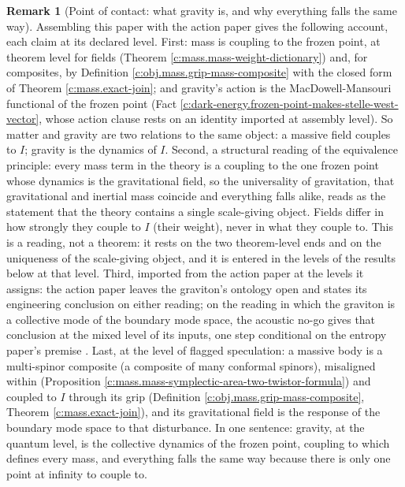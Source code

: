 \documentclass[11pt]{article}
\theoremstyle{definition}
\newtheorem{remark}[theorem]{Remark}
\theoremstyle{plain}
\newcommand{\changedmark}[2]{\marginpar{\raggedright\scriptsize\color{#1}#2}}
\begin{document}
\begin{remark}[Point of contact: what gravity is, and why everything falls the same way]\label{c:note.mass.point-contact-what-gravity-why-everything}
\changedmark{gray}{reworded}
Assembling this paper with the action paper gives the following account, each claim at its declared level. First: mass is coupling to the frozen point, at theorem level for fields (Theorem \ref{c:mass.mass-weight-dictionary}) and, for composites, by Definition \ref{c:obj.mass.grip-mass-composite} with the closed form of Theorem \ref{c:mass.exact-join}; and gravity's action is the MacDowell-Mansouri functional of the frozen point (Fact \ref{c:dark-energy.frozen-point-makes-stelle-west-vector}, whose action clause rests on an identity imported at assembly level). So matter and gravity are two relations to the same object: a massive field couples to $I$; gravity is the dynamics of $I$. Second, a structural reading of the equivalence principle: every mass term in the theory is a coupling to the one frozen point whose dynamics is the gravitational field, so the universality of gravitation, that gravitational and inertial mass coincide and everything falls alike, reads as the statement that the theory contains a single scale-giving object. Fields differ in how strongly they couple to $I$ (their weight), never in what they couple to. This is a reading, not a theorem: it rests on the two theorem-level ends and on the uniqueness of the scale-giving object, and it is entered in the levels of the results below at that level. Third, imported from the action paper at the levels it assigns: the action paper leaves the graviton's ontology open and states its engineering conclusion on either reading; on the reading in which the graviton is a collective mode of the boundary mode space, the acoustic no-go gives that conclusion at the mixed level of its inputs, one step conditional on the entropy paper's premise \cite[\S\S5--6]{ButlerT10}. Last, at the level of flagged speculation: a massive body is a multi-spinor composite (a composite of many conformal spinors), misaligned within (Proposition \ref{c:mass.mass-symplectic-area-two-twistor-formula}) and coupled to $I$ through its grip (Definition \ref{c:obj.mass.grip-mass-composite}, Theorem \ref{c:mass.exact-join}), and its gravitational field is the response of the boundary mode space to that disturbance. In one sentence: gravity, at the quantum level, is the collective dynamics of the frozen point, coupling to which defines every mass, and everything falls the same way because there is only one point at infinity to couple to.
\end{remark}
\end{document}
